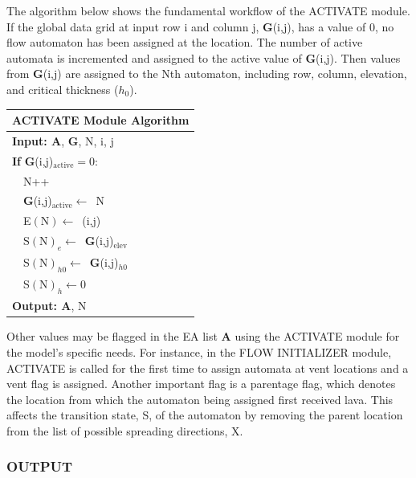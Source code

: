 \documentclass[12pt,letter]{article}
\begin{document}
			The algorithm below shows the fundamental workflow of the ACTIVATE module. If the global data grid at input row i and column j, \textbf{G}(i,j), has a value of 0, no flow automaton has been assigned at the location. The number of active automata is incremented and assigned to the active value of \textbf{G}(i,j). Then values from \textbf{G}(i,j) are assigned to the Nth automaton, including row, column, elevation, and critical thickness ($h_0$).
		
			\begin{center}
				\begin{tabular}{l}
					\toprule
					\textbf{ACTIVATE Module Algorithm}\\
					\midrule
					\textbf{Input: A}, \textbf{G}, N, i, j\\
					\textbf{If} \textbf{G}(i,j)$_{\textrm{active}}=0$:\\
					~~N++\\
					~~\textbf{G}(i,j)$_{\textrm{active}}\leftarrow$~N\\
					~~E$(\textrm{N})\leftarrow$~(i,j)\\
					~~S$(\textrm{N})_e\leftarrow$~\textbf{G}(i,j)$_{\mathrm{elev}}$\\
					~~S$(\textrm{N})_{h0}\leftarrow$~\textbf{G}(i,j)$_{h0}$\\
					~~S$(\textrm{N})_{h}\leftarrow0$\\
					\textbf{Output: A}, N\\
					\bottomrule
				\end{tabular}
			\end{center}
		
			Other values may be flagged in the EA list \textbf{A} using the ACTIVATE module for the model's specific needs. For instance, in the FLOW INITIALIZER module, ACTIVATE is called for the first time to assign automata at vent locations and a vent flag is assigned. Another important flag is a parentage flag, which denotes the location from which the automaton being assigned first received lava. This affects the transition state, S, of the automaton by removing the parent location from the list of possible spreading directions, X.
		
		\subsubsection{OUTPUT}\label{mod:output}
			
\end{document}
